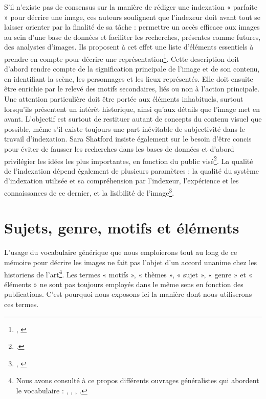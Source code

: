 S’il n’existe pas de consensus sur la manière de rédiger une indexation « parfaite » pour décrire une image, ces auteurs soulignent que l’indexeur doit avant tout se laisser orienter par la finalité de sa tâche : permettre un accès efficace aux images au sein d’une base de données et faciliter les recherches, présentes comme futures, des analystes d’images. Ils proposent à cet effet une liste d’éléments essentiels à prendre en compte pour décrire une représentation\footnote{\cite[p. 57-58]{vanstratenIconographyIndexingIconclass1994}, \cite[p. 25]{garnierThesaurusIconographiqueSysteme1984}}. Cette description doit d’abord rendre compte de la signification principale de l’image et de son contenu, en identifiant la scène, les personnages et les lieux représentés. Elle doit ensuite être enrichie par le relevé des motifs secondaires, liés ou non à l’action principale. Une attention particulière doit être portée aux éléments inhabituels, surtout lorsqu’ils présentent un intérêt historique, ainsi qu’aux détails que l’image met en avant. L’objectif est surtout de restituer autant de concepts du contenu visuel que possible, même s’il existe toujours une part inévitable de subjectivité dans le travail d’indexation. Sara Shatford insiste également sur le besoin d’être concis pour éviter de fausser les recherches dans les bases de données et d’abord privilégier les idées les plus importantes, en fonction du public visé\footcite{shatfordDescribingPictureThousand1984}. La qualité de l’indexation dépend également de plusieurs paramètres : la qualité du système d’indexation utilisée et sa compréhension par l’indexeur, l’expérience et les connaissances de ce dernier, et la lisibilité de l’image\footnote{\cite[p. 24]{garnierThesaurusIconographiqueSysteme1984}, \cite[p. 37]{vanstratenIconographyIndexingIconclass1994}}.

\section{Sujets, genre, motifs et éléments}

L’usage du vocabulaire générique que nous emploierons tout au long de ce mémoire pour décrire les images ne fait pas l’objet d’un accord unanime chez les historiens de l’art\footnote{Nous avons consulté à ce propos différents ouvrages généralistes qui abordent le vocabulaire : \cite{vanstratenIntroductionIconography1994}, \cite{barralialtetDictionnaireCritiqueDiconographie2003}, \cite{bergeonlanglePeintureDessinVocabulaire2009}, \cite{gervereauVoirComprendreAnalyser2020}.}. Les termes « motifs », « thèmes », « sujet », « genre » et « éléments » ne sont pas toujours employés dans le même sens en fonction des publications. C’est pourquoi nous exposons ici la manière dont nous utiliserons ces termes. 

